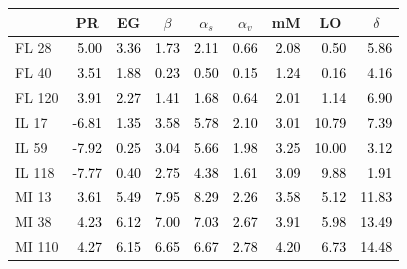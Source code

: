 \documentclass{article}
\begin{document}
\begin{tabular}{lrrrrrrrr}
\toprule
 & \multicolumn{1}{c}{PR} & \multicolumn{1}{c}{EG} & \multicolumn{1}{c}{$\beta$} & \multicolumn{1}{c}{$\alpha_s$} & \multicolumn{1}{c}{$\alpha_v$} & \multicolumn{1}{c}{mM} & \multicolumn{1}{c}{LO} & \multicolumn{1}{c}{$\delta$} \\
\midrule
FL 28 & \textcolor{black}{ 5.00 } & \textcolor{black}{ 3.36 } & \textcolor{black}{ 1.73 } & \textcolor{black}{ 2.11 } & \textcolor{black}{ 0.66 } & \textcolor{black}{ 2.08 } & \textcolor{black}{ 0.50 } & \textcolor{black}{ 5.86 } \\
FL 40 & \textcolor{black}{ 3.51 } & \textcolor{black}{ 1.88 } & \textcolor{black}{ 0.23 } & \textcolor{black}{ 0.50 } & \textcolor{black}{ 0.15 } & \textcolor{black}{ 1.24 } & \textcolor{black}{ 0.16 } & \textcolor{black}{ 4.16 } \\
FL 120 & \textcolor{black}{ 3.91 } & \textcolor{black}{ 2.27 } & \textcolor{black}{ 1.41 } & \textcolor{black}{ 1.68 } & \textcolor{black}{ 0.64 } & \textcolor{black}{ 2.01 } & \textcolor{black}{ 1.14 } & \textcolor{black}{ 6.90 } \\
IL 17 & \textcolor{black}{ -6.81 } & \textcolor{black}{ 1.35 } & \textcolor{black}{ 3.58 } & \textcolor{black}{ 5.78 } & \textcolor{black}{ 2.10 } & \textcolor{black}{ 3.01 } & \textcolor{black}{ 10.79 } & \textcolor{black}{ 7.39 } \\
IL 59 & \textcolor{black}{ -7.92 } & \textcolor{black}{ 0.25 } & \textcolor{black}{ 3.04 } & \textcolor{black}{ 5.66 } & \textcolor{black}{ 1.98 } & \textcolor{black}{ 3.25 } & \textcolor{black}{ 10.00 } & \textcolor{black}{ 3.12 } \\
IL 118 & \textcolor{black}{ -7.77 } & \textcolor{black}{ 0.40 } & \textcolor{black}{ 2.75 } & \textcolor{black}{ 4.38 } & \textcolor{black}{ 1.61 } & \textcolor{black}{ 3.09 } & \textcolor{black}{ 9.88 } & \textcolor{black}{ 1.91 } \\
MI 13 & \textcolor{black}{ 3.61 } & \textcolor{black}{ 5.49 } & \textcolor{black}{ 7.95 } & \textcolor{black}{ 8.29 } & \textcolor{black}{ 2.26 } & \textcolor{black}{ 3.58 } & \textcolor{black}{ 5.12 } & \textcolor{black}{ 11.83 } \\
MI 38 & \textcolor{black}{ 4.23 } & \textcolor{black}{ 6.12 } & \textcolor{black}{ 7.00 } & \textcolor{black}{ 7.03 } & \textcolor{black}{ 2.67 } & \textcolor{black}{ 3.91 } & \textcolor{black}{ 5.98 } & \textcolor{black}{ 13.49 } \\
MI 110 & \textcolor{black}{ 4.27 } & \textcolor{black}{ 6.15 } & \textcolor{black}{ 6.65 } & \textcolor{black}{ 6.67 } & \textcolor{black}{ 2.78 } & \textcolor{black}{ 4.20 } & \textcolor{black}{ 6.73 } & \textcolor{black}{ 14.48 } \\

\end{tabular}
\end{document}
